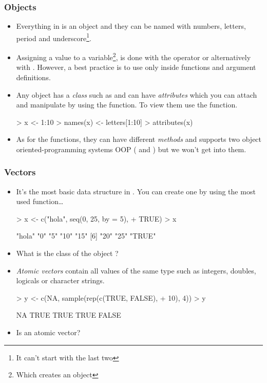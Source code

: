\begin{frame}
  \frametitle{Objects}
  \begin{itemize}
  \item Everything in  is an object and they can be named with numbers, letters, period and underscore\footnote{It can't start with the last two}.
  \item Assigning a value to a variable\footnote{Which creates an object}, is done with the \pl{<-} operator or alternatively with \pl{=}. However, a best practice is to use \pl{=} only inside functions and argument definitions.
  \item Any object has a \emph{class} such as  and can have \emph{attributes} which you can attach and manipulate by using the  function. To view them use the  function.
\begin{Schunk}
\begin{Sinput}
> x <- 1:10
> names(x) <- letters[1:10]
> attributes(x)
\end{Sinput}
\end{Schunk}
  \item As for the functions, they can have different \emph{methods} and  supports two object oriented-programming systems OOP ( and ) but we won't get into them.
  \end{itemize}
\end{frame}

\begin{frame}
  \frametitle{Vectors}
  \begin{itemize}
  \item It's the most basic data structure in . You can create one by using the \alert{most} used  function\ldots {} 
\begin{Schunk}
\begin{Sinput}
> x <- c("hola", seq(0, 25, by = 5), 
+     TRUE)
> x
\end{Sinput}
\begin{Soutput}
[1] "hola" "0"    "5"    "10"   "15"  
[6] "20"   "25"   "TRUE"
\end{Soutput}
\end{Schunk}
  \item What is the class of the object ?
  \item \emph{Atomic vectors} contain all values of the same type such as integers, doubles, logicals or character strings.
\begin{Schunk}
\begin{Sinput}
> y <- c(NA, sample(rep(c(TRUE, FALSE), 
+     10), 4))
> y
\end{Sinput}
\begin{Soutput}
[1]    NA  TRUE  TRUE  TRUE FALSE
\end{Soutput}
\end{Schunk}
  \item Is  an atomic vector?
  \end{itemize}
\end{frame}

